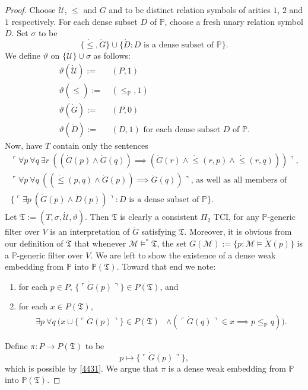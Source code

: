 \documentclass[12pt]{article}
\numberwithin{equation}{section}
\begin{document}
\begin{proof}
Choose $\dot{\mathcal{U}}$, $\dot{\leq}$ and $\dot{G}$ and to be distinct relation symbols of arities $1$, $2$ and $1$ respectively. For each dense subset $D$ of $\mathbb{P}$, choose a fresh unary relation symbol $\dot{D}$. Set $\sigma$ to be $$\{\dot{\leq}, \dot{G}\} \cup \{\dot{D} : D \text{ is a dense subset of } \mathbb{P}\} \text{.}$$ We define $\vartheta$ on $\{\dot{\mathcal{U}}\} \cup \sigma$ as follows:
\begin{align*}
    \vartheta(\dot{\mathcal{U}}) := \ & (P, 1) \\
    \vartheta(\dot{\leq}) := \ & (\leq_{\mathbb{P}}, 1) \\
    \vartheta(\dot{G}) := \ & (P, 0) \\
    \vartheta(\dot{D}) := \ & (D, 1) \text{ for each dense subset } D \text{ of } \mathbb{P} \text{.}
\end{align*}
Now, have $T$ contain only the sentences
\begin{gather*}
    \ulcorner \forall p \ \forall q \ \exists r \ ((\dot{G}(p) \wedge \dot{G}(q)) \implies (\dot{G}(r) \wedge \dot{\leq}(r, p) \wedge \dot{\leq}(r, q))) \urcorner \text{,} \\
    \ulcorner \forall p \ \forall q \ ((\dot{\leq}(p, q) \wedge \dot{G}(p)) \implies \dot{G}(q)) \urcorner \text{, as well as all members of} \\
    \{\ulcorner \exists p \ (\dot{G}(p) \wedge \dot{D}(p)) \urcorner : D \text{ is a dense subset of } \mathbb{P}\} \text{.}
\end{gather*} 
Let $\mathfrak{T} := (T, \sigma, \dot{\mathcal{U}}, \vartheta)$. Then $\mathfrak{T}$ is clearly a consistent $\Pi_2$ TCI, for any $\mathbb{P}$-generic filter over $V$ is an interpretation of $\dot{G}$ satisfying $\mathfrak{T}$. Moreover, it is obvious from our definition of $\mathfrak{T}$ that whenever $\mathcal{M} \models^* \mathfrak{T}$, the set $G(\mathcal{M}) := \{p : \mathcal{M} \models \dot{X}(p)\}$ is a $\mathbb{P}$-generic filter over $V$. We are left to show the existence of a dense weak embedding from $\mathbb{P}$ into $\mathbb{P}(\mathfrak{T})$. Toward that end we note:
\begin{enumerate}[label=(\arabic*)]
    \item\label{4431} for each $p \in P$, $\{\ulcorner \dot{G}(p) \urcorner\} \in P(\mathfrak{T})$, and
    \item\label{4432} for each $x \in P(\mathfrak{T})$, 
    \begin{align*}
        \exists p \ \forall q \ (x \cup \{\ulcorner \dot{G}(p) \urcorner\} \in P(\mathfrak{T}) & \wedge (\ulcorner \dot{G}(q) \urcorner \in x \implies p \leq_{\mathbb{P}} q)) \text{.}
    \end{align*}
\end{enumerate} 
Define $\pi : P \longrightarrow P(\mathfrak{T})$ to be $$p \mapsto \{\ulcorner \dot{G}(p) \urcorner\},$$ which is possible by \ref{4431}. We argue that $\pi$ is a dense weak embedding from $\mathbb{P}$ into $\mathbb{P}(\mathfrak{T})$.


\end{proof}
\end{document}
